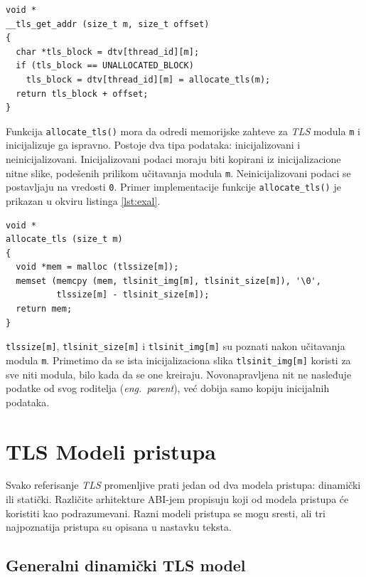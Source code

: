 \documentclass[12pt,oneside]{memoir}
\begin{document}
\begin{lstlisting}[style=customc, label={lst:ex2}, caption={Promena implementacije funkcije \texttt{\_\_tls\_get\_addr()}.}]
void *
__tls_get_addr (size_t m, size_t offset)
{
  char *tls_block = dtv[thread_id][m];
  if (tls_block == UNALLOCATED_BLOCK)
    tls_block = dtv[thread_id][m] = allocate_tls(m);
  return tls_block + offset;
}

\end{lstlisting}

Funkcija \texttt{allocate\_tls()} mora da odredi memorijske zahteve za \emph{TLS} modula \texttt{m} i inicijalizuje ga ispravno. Postoje dva tipa podataka: inicijalizovani i neinicijalizovani. Inicijalizovani podaci moraju biti kopirani iz inicijalizacione nitne slike, podešenih prilikom učitavanja modula \texttt{m}. Neinicijalizovani podaci se postavljaju na vredosti \texttt{0}. Primer implementacije funkcije \texttt{allocate\_tls()} je prikazan u okviru listinga \ref{lst:exal}.

\begin{lstlisting}[style=customc, label={lst:exal}, caption={Implementacija funkcije \texttt{allocate\_tls()}.}]
void *
allocate_tls (size_t m)
{
  void *mem = malloc (tlssize[m]);
  memset (memcpy (mem, tlsinit_img[m], tlsinit_size[m]), '\0',
          tlssize[m] - tlsinit_size[m]);
  return mem;
}

\end{lstlisting}

\texttt{tlssize[m]}, \texttt{tlsinit\_size[m]} i \texttt{tlsinit\_img[m]} su poznati nakon učitavanja modula \texttt{m}. Primetimo da se ista inicijalizaciona slika \texttt{tlsinit\_img[m]} koristi za sve niti modula, bilo kada da se one kreiraju. Novonapravljena nit ne nasleđuje podatke od svog roditelja (\emph{eng.~parent}), već dobija samo kopiju inicijalnih podataka.

\section{TLS Modeli pristupa}

Svako referisanje \emph{TLS} promenljive prati jedan od dva modela pristupa: dinamički ili statički. Različite arhitekture ABI-jem propisuju koji od modela pristupa će koristiti kao podrazumevani. Razni modeli pristupa se mogu sresti, ali tri najpoznatija pristupa su opisana u nastavku teksta.

\subsection{Generalni dinamički TLS model}
\end{document}
